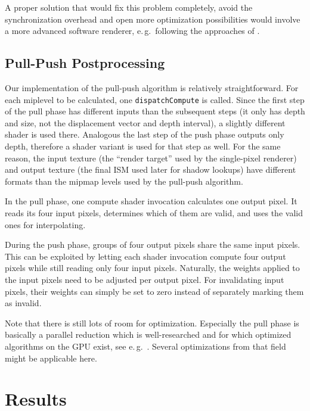  A proper solution that would fix this problem completely, avoid the synchronization overhead and open more optimization possibilities would involve a more advanced software renderer, e.\,g.\ following the approaches of \cite{Laine:2011:SoftwareRasterization}.


 \subsection{Pull-Push Postprocessing}
 \label{sec:impl:pullPushPostprocessing}

 Our implementation of the pull-push algorithm is relatively straightforward. For each miplevel to be calculated, one \texttt{dispatchCompute} is called. Since the first step of the pull phase has different inputs than the subsequent steps (it only has depth and size, not the displacement vector and depth interval), a slightly different shader is used there. Analogous the last step of the push phase outputs only depth, therefore a shader variant is used for that step as well. For the same reason, the input texture (the ``render target'' used by the single-pixel renderer) and output texture (the final ISM used later for shadow lookups) have different formats than the mipmap levels used by the pull-push algorithm.



 In the pull phase, one compute shader invocation calculates one output pixel. It reads its four input pixels, determines which of them are valid, and uses the valid ones for interpolating.


 During the push phase, groups of four output pixels share the same input pixels. This can be exploited by letting each shader invocation compute four output pixels while still reading only four input pixels. Naturally, the weights applied to the input pixels need to be adjusted per output pixel. For invalidating input pixels, their weights can simply be set to zero instead of separately marking them as invalid.


 Note that there is still lots of room for optimization. Especially the pull phase is basically a parallel reduction which is well-researched and for which optimized algorithms on the GPU exist, see e.\,g.\ \cite{Harris:2007:ParallelReduction}. Several optimizations from that field might be applicable here.






 \section{Results}


